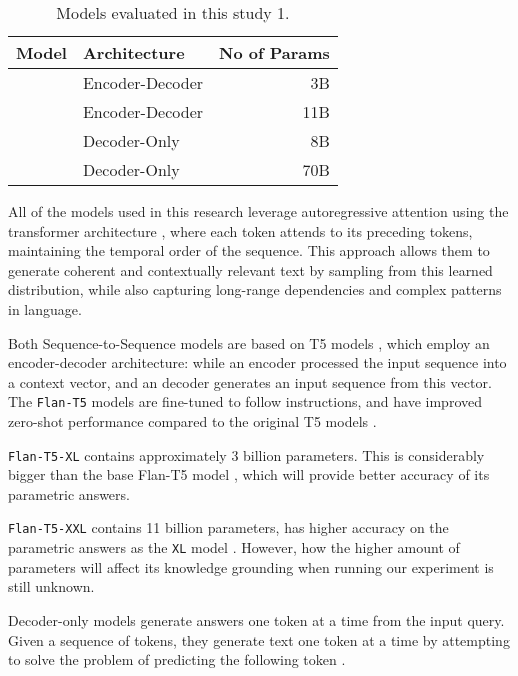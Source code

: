 \begin{table}[b]
	\centering
	\small
	\begin{tabular}{p{100pt} l r}
		\toprule
			Model             & Architecture    & No of Params \\
		\midrule
			\smallflan{}      & Encoder-Decoder & 3B          \\[5pt]
			\bigflan{}        & Encoder-Decoder & 11B         \\[5pt]
			\llamaparbox{}    & Decoder-Only    & 8B          \\[10pt]
			\bigllamaparbox{} & Decoder-Only    & 70B         \\[10pt]
		\bottomrule
	\end{tabular}
	\caption{Models evaluated in this study 1.}
	\label{model_list}
\end{table}

All of the models used in this research leverage autoregressive attention using the transformer architecture \cite{attention_is_all_you_need}, where each token attends to its preceding tokens, maintaining the temporal order of the sequence.
This approach allows them to generate coherent and contextually relevant text by sampling from this learned distribution, while also capturing long-range dependencies and complex patterns in language.

Both Sequence-to-Sequence models are based on T5 models \cite{t5}, which employ an encoder-decoder architecture: while an encoder processed the input sequence into a context vector, and an decoder generates an input sequence from this vector.
The \texttt{Flan-T5} models are fine-tuned to follow instructions, and have improved zero-shot performance compared to the original T5 models \cite{flant5}.

\texttt{Flan-T5-XL} contains approximately 3 billion parameters.
This is considerably bigger than the base Flan-T5 model \cite{flant5}, which will provide better accuracy of its parametric answers.

\texttt{Flan-T5-XXL} contains 11 billion parameters, has higher accuracy on the parametric answers as the \texttt{XL} model \cite{flant5}.
However, how the higher amount of parameters will affect its knowledge grounding when running our experiment is still unknown.

Decoder-only models generate answers one token at a time from the input query.
Given a sequence of tokens, they generate text one token at a time by attempting to solve the problem of predicting the following token \cite{gpt}.

